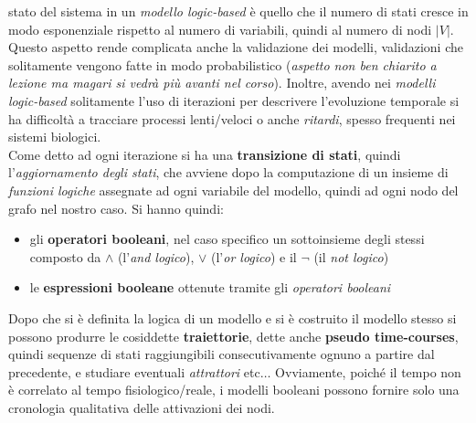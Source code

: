 \documentclass[a4paper,12pt, oneside]{book}
\begin{document}
stato del sistema in un \textit{modello logic-based} è quello che il numero di
stati cresce in modo esponenziale rispetto al numero di variabili, quindi al
numero di nodi $|V|$. Questo aspetto rende complicata anche la validazione dei
modelli, validazioni che solitamente vengono fatte in modo probabilistico
(\textit{aspetto non ben chiarito a lezione ma magari si vedrà più avanti nel
  corso}). Inoltre, avendo nei \textit{modelli logic-based} solitamente l'uso di
iterazioni per descrivere l'evoluzione temporale si ha difficoltà a tracciare
processi lenti/veloci o anche \textit{ritardi}, spesso frequenti nei sistemi
biologici.\\
Come detto ad ogni iterazione si ha una \textbf{transizione di stati}, quindi\\
l'\textit{aggiornamento degli stati}, che avviene dopo la computazione di un
insieme di \textit{funzioni logiche} assegnate ad ogni variabile del modello,
quindi ad ogni nodo del grafo nel nostro caso. Si hanno quindi:
\begin{itemize}
  \item gli \textbf{operatori booleani}, nel caso specifico un sottoinsieme
  degli stessi composto da $\land$ (l'\textit{and logico}), $\lor$ (l'\textit{or
    logico}) e il $\neg$ (il \textit{not logico})
  \item le \textbf{espressioni booleane} ottenute tramite gli \textit{operatori
    booleani} 
\end{itemize}
Dopo che si è definita la logica di un modello e si è costruito il modello
stesso si possono produrre le cosiddette \textbf{traiettorie}, dette anche
\textbf{pseudo time-courses}, quindi sequenze di stati raggiungibili
consecutivamente ognuno a partire dal precedente, e studiare eventuali
\textit{attrattori} etc$\ldots$ Ovviamente, poiché il tempo non è correlato al
tempo fisiologico/reale, i modelli booleani possono fornire solo una cronologia
qualitativa delle attivazioni dei nodi.
\end{document}
